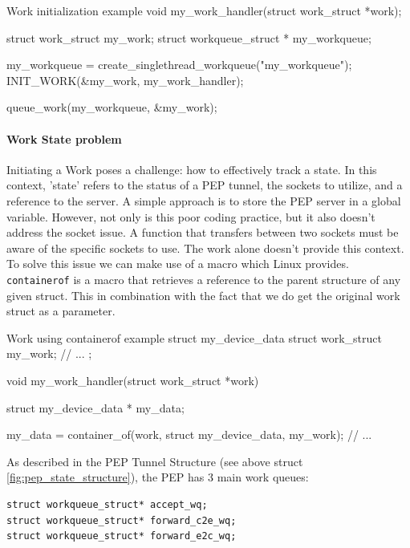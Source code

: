 \documentclass[a4paper,english, 11pt]{report}
\begin{document}
\begin{autonumlstlisting}[label=lst:work_init]{Work initialization example}
void my_work_handler(struct work_struct *work);

struct work_struct my_work;
struct workqueue_struct * my_workqueue;

my_workqueue = create_singlethread_workqueue("my_workqueue");
INIT_WORK(&my_work, my_work_handler);

queue_work(my_workqueue, &my_work);
\end{autonumlstlisting}

\paragraph{Work State problem}
Initiating a Work poses a challenge: how to effectively track a state. In this context, 'state' refers to the status of a PEP tunnel, the sockets to utilize, and a reference to the server. A simple approach is to store the PEP server in a global variable. However, not only is this poor coding practice, but it also doesn't address the socket issue. A function that transfers between two sockets must be aware of the specific sockets to use. The work alone doesn't provide this context.\\

To solve this issue we can make use of a macro which Linux provides. \verb|containerof| is a macro that retrieves a reference to the parent structure of any given struct. This in combination with the fact that we do get the original work struct as a parameter.\\

\begin{autonumlstlisting}[label=lst:work_containerof]{Work using containerof example}
struct my_device_data {
    struct work_struct my_work;
    // ...
};

void my_work_handler(struct work_struct *work)
{
   struct my_device_data * my_data;

   my_data = container_of(work, struct my_device_data,  my_work);
   // ...
}
\end{autonumlstlisting}

As described in the PEP Tunnel Structure (see above struct \ref{fig:pep_state_structure}), the PEP has 3 main work queues:
\begin{verbatim}
struct workqueue_struct* accept_wq;
struct workqueue_struct* forward_c2e_wq;
struct workqueue_struct* forward_e2c_wq;
\end{verbatim}
\end{document}
